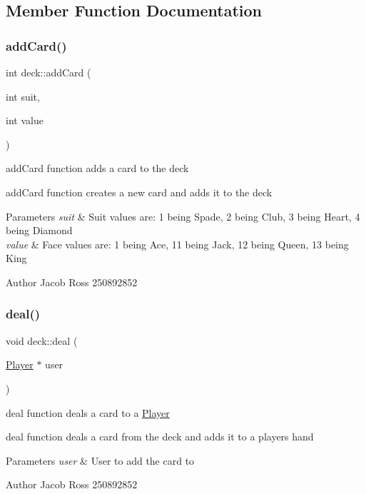 \subsection{Member Function Documentation}
\mbox{\label{classdeck_a12c0517bc9926f407aee8262ace72bf8}} 
\subsubsection{\texorpdfstring{add\+Card()}{addCard()}}
{\footnotesize\ttfamily int deck\+::add\+Card (\begin{DoxyParamCaption}\item[{int}]{suit,  }\item[{int}]{value }\end{DoxyParamCaption})}



add\+Card function adds a card to the deck 

add\+Card function creates a new card and adds it to the deck 
\begin{DoxyParams}{Parameters}
{\em suit} & Suit values are\+: 1 being Spade, 2 being Club, 3 being Heart, 4 being Diamond \\
\hline
{\em value} & Face values are\+: 1 being Ace, 11 being Jack, 12 being Queen, 13 being King \\
\hline
\end{DoxyParams}
\begin{DoxyAuthor}{Author}
Jacob Ross 250892852 
\end{DoxyAuthor}
\mbox{\label{classdeck_a6cf31d4e598d0c5b1aa8588eaeacea7c}} 
\subsubsection{\texorpdfstring{deal()}{deal()}}
{\footnotesize\ttfamily void deck\+::deal (\begin{DoxyParamCaption}\item[{\hyperlink{classPlayer}{Player} $\ast$}]{user }\end{DoxyParamCaption})}



deal function deals a card to a \hyperlink{classPlayer}{Player} 

deal function deals a card from the deck and adds it to a players hand 
\begin{DoxyParams}{Parameters}
{\em user} & User to add the card to \\
\hline
\end{DoxyParams}
\begin{DoxyAuthor}{Author}
Jacob Ross 250892852 
\end{DoxyAuthor}
\mbox{\label{classdeck_ad99960c3630e78a74612765b01c21b61}} 
